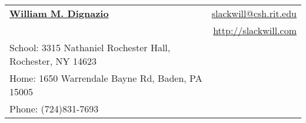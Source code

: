 \documentclass[letterpaper,11pt]{article}
\begin{document}
 

\newcommand{\mywebheader}{
\begin{tabular*}{7in}{l@{\extracolsep{\fill}}r}
	\textbf{\href{http://www.slackwill.com/}{\Huge William M. Dignazio}} & \href{mailto:slackwill@csh.rit.edu}{slackwill@csh.rit.edu}\\ &
	\href{http://slackwill.com/}{http://slackwill.com} \\
	{\footnotesize {{School: 3315 Nathaniel Rochester Hall,
Rochester, NY 14623}}} & \\
	{\footnotesize {{Home: 1650 Warrendale Bayne Rd, Baden, PA 15005}}} & \\
	{\footnotesize {{Phone: (724)831-7693}}} & 

	\end{tabular*}
\\
\vspace{0.1in}}

\mywebheader
\end{document}
